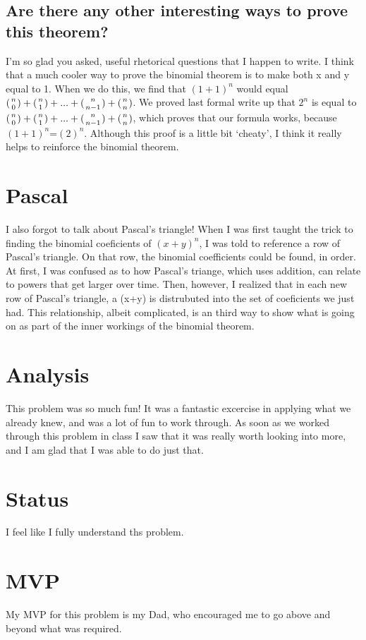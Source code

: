 \documentclass[11pt]{article} %
\newcommand\tab[1][1cm]{\hspace*{#1}}
\begin{document}
\subsection*{Are there any other interesting ways to prove this theorem?} 
\tab I'm so glad you asked, useful rhetorical questions that I happen to write. I think that a much cooler way to prove the binomial theorem is to make both x and y equal to 1. When we do this, we find that $(1+1)^n$ would equal $({n\atop 0})+ ({n\atop 1}) + ... + ({n\atop n-1}) + ({n\atop n})$. We proved last formal write up that $2^n$ is equal to $({n\atop 0})+ ({n\atop 1}) + ... + ({n\atop n-1}) + ({n\atop n})$, which proves that our formula works, because $(1+1)^n$=$(2)^n$. Although this proof is a little bit `cheaty', I think it really helps to reinforce the binomial theorem. 

\section*{Pascal}
\tab I also forgot to talk about Pascal's triangle! When I was first taught the trick to finding the binomial coeficients of $(x+y)^n$, I was told to reference a row of Pascal's triangle. On that row, the binomial coefficients could be found, in order. At first, I was confused as to how Pascal's triange, which uses addition, can relate to powers that get larger over time. Then, however, I realized that in each new row of Pascal's triangle, a (x+y) is distrubuted into the set of coeficients we just had. This relationship, albeit complicated, is an third way to show what is going on as part of the inner workings of the binomial theorem.

\section* {Analysis}
\tab This problem was so much fun! It was a fantastic excercise in applying what we already knew, and was a lot of fun to work through. As soon as we worked through this problem in class I saw that it was really worth looking into more, and I am glad that I was able to do just that. 

\section* {Status}
I feel like I fully understand ths problem.

\section* {MVP}
My MVP for this problem is my Dad, who encouraged me to go above and beyond what was required.
\end{document}
